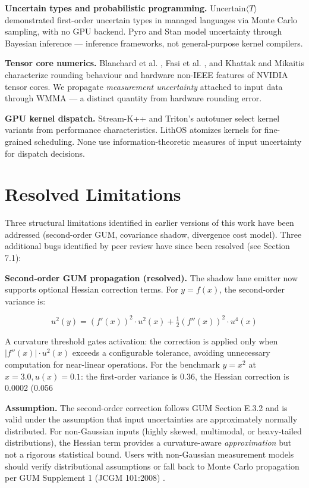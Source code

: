 \documentclass[11pt]{article}
\begin{document}
{{\textbf{Uncertain types and probabilistic programming.} Uncertain$\langle T \rangle$ \cite{uncertaint2014} demonstrated first-order uncertain types in managed languages via Monte Carlo sampling, with no GPU backend. Pyro \cite{pyro2019} and Stan \cite{stan2017} model uncertainty through Bayesian inference --- inference frameworks, not general-purpose kernel compilers.

\textbf{Tensor core numerics.} Blanchard et al. \cite{blanchard2020}, Fasi et al. \cite{fasi2021}, and Khattak and Mikaitis \cite{khattak2025} characterize rounding behaviour and hardware non-IEEE features of NVIDIA tensor cores. We propagate \emph{measurement uncertainty} attached to input data through WMMA --- a distinct quantity from hardware rounding error.

\textbf{GPU kernel dispatch.} Stream-K++ \cite{streamkpp2024} and Triton's autotuner \cite{triton2019} select kernel variants from performance characteristics. LithOS \cite{lithos2025} atomizes kernels for fine-grained scheduling. None use information-theoretic measures of input uncertainty for dispatch decisions.


\section{Resolved Limitations}

Three structural limitations identified in earlier versions of this work have been addressed (second-order GUM, covariance shadow, divergence cost model). Three additional bugs identified by peer review have since been resolved (see Section 7.1):

\textbf{Second-order GUM propagation (resolved).} The shadow lane emitter now supports optional Hessian correction terms. For $y = f(x)$, the second-order variance is:

\[u^2(y) = (f'(x))^2 \cdot u^2(x) + \tfrac{1}{2} (f''(x))^2 \cdot u^4(x)\]

A curvature threshold gates activation: the correction is applied only when $|f''(x)| \cdot u^2(x)$ exceeds a configurable tolerance, avoiding unnecessary computation for near-linear operations. For the benchmark $y = x^2$ at $x = 3.0, u(x) = 0.1$: the first-order variance is 0.36, the Hessian correction is 0.0002 (0.056%

\textbf{Assumption.} The second-order correction follows GUM Section E.3.2 and is valid under the assumption that input uncertainties are approximately normally distributed. For non-Gaussian inputs (highly skewed, multimodal, or heavy-tailed distributions), the Hessian term provides a curvature-aware \emph{approximation} but not a rigorous statistical bound. Users with non-Gaussian measurement models should verify distributional assumptions or fall back to Monte Carlo propagation per GUM Supplement 1 (JCGM 101:2008) \cite{jcgm101}.

}}
\end{document}
